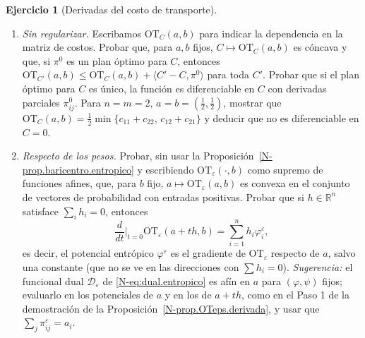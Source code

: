 \documentclass[11pt,a4paper]{amsart}
\newcounter{chapter}
\newcommand{\ve}{\varepsilon}
\newcommand{\R}{{\mathbb R}}
\theoremstyle{remark}
\theoremstyle{definition}
\newtheorem{ejercicio}{Ejercicio}[chapter]
\numberwithin{subsection}{section}
\numberwithin{equation}{section}
\begin{document}
\begin{ejercicio}[Derivadas del costo de transporte]\label{ejer.OTeps.derivadas}
\leavevmode
\begin{enumerate}[label=(\alph*)]
\item \emph{Sin regularizar.} Escribamos $\mathrm{OT}_C(a,b)$ para indicar la
dependencia en la matriz de costos. Probar que, para $a,b$ fijos,
$C\mapsto\mathrm{OT}_C(a,b)$ es cóncava y que, si $\pi^0$ es un plan óptimo para $C$,
entonces $\mathrm{OT}_{C'}(a,b)\le\mathrm{OT}_C(a,b)+\langle C'-C,\pi^0\rangle$
para toda $C'$. Probar que si el plan óptimo para $C$ es único, la función es
diferenciable en $C$ con derivadas parciales $\pi^0_{ij}$. Para $n=m=2$,
$a=b=(\frac12,\frac12)$, mostrar que
$\mathrm{OT}_C(a,b)=\frac12\min\{c_{11}+c_{22},\,c_{12}+c_{21}\}$ y deducir que
no es diferenciable en $C=0$.
\item \emph{Respecto de los pesos.} Probar, sin usar la
Proposición~\ref{N-prop.baricentro.entropico} y escribiendo
$\mathrm{OT}_\ve(\cdot,b)$ como supremo de funciones afines, que, para $b$
fijo, $a\mapsto\mathrm{OT}_\ve(a,b)$ es convexa en el conjunto de vectores de
probabilidad con entradas positivas. Probar que si $h\in\R^n$ satisface
$\sum_ih_i=0$, entonces
\[
\frac{d}{dt}\Big|_{t=0}\mathrm{OT}_\ve(a+th,b)=\sum_{i=1}^nh_i\varphi^\ve_i,
\]
es decir, el potencial entrópico $\varphi^\ve$ es el gradiente de
$\mathrm{OT}_\ve$ respecto de $a$, salvo una constante (que no se ve en las
direcciones con $\sum h_i=0$). \emph{Sugerencia:} el funcional dual
$\mathcal D_\ve$ de \eqref{N-eq:dual.entropico} es afín en $a$ para
$(\varphi,\psi)$ fijos; evaluarlo en los potenciales de $a$ y en los de
$a+th$, como en el Paso 1 de la demostración de la
Proposición~\ref{N-prop.OTeps.derivada}, y usar que $\sum_j\pi^\ve_{ij}=a_i$.
\end{enumerate}
\end{ejercicio}
\end{document}
